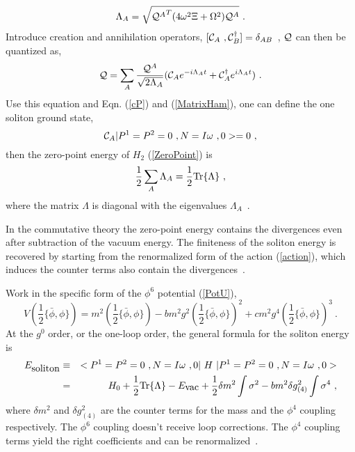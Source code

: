 \documentclass[a4paper,a4paper]{article}
\def\Tr{{\hbox{Tr}}}
\def\cQ{{\cal Q}}
\begin{document}
\begin{equation}
\Lambda_A=\sqrt{{\cQ^A}^T(4\omega^2\Xi+\Omega^2)\cQ^A}\ .                                         \label{EigenFreq}
\end{equation}
Introduce creation and annihilation operators, $[{\cal C}_A\ ,{\cal C}_B^\dag]=\delta_{AB}$\ ,
$\cQ$ can then be quantized as, 
\begin{equation}
  \cQ=\sum_A\frac {\cQ^A}{\sqrt{2\Lambda_A}}
({\cal C}_Ae^{-i\Lambda_At}+{\cal C}_A^\dag e^{i\Lambda_At})\ . 
\end{equation}
Use this equation and Eqn. (\ref{cP}) and (\ref{MatrixHam}), one can 
define the one soliton ground state, 
\begin{equation}
  {\cal C}_A|P^1=P^2=0\ ,N=I\omega\ ,0>=0\ ,
\end{equation}
then the zero-point energy of $H_2$ (\ref{ZeroPoint}) is 
\begin{equation}
  \frac 12\sum_A\Lambda_A=\frac 12\Tr\{\Lambda\}\ ,                                          \label{ZeroPoint2}
\end{equation}
where the matrix $\Lambda$ is diagonal with the eigenvalues $\Lambda_A$\ .

In the commutative theory the zero-point energy contains the divergences
even after subtraction of the vacuum energy. The finiteness of the soliton energy 
is recovered by starting from the renormalized form of the action (\ref{action}), 
which induces the counter terms also contain the divergences~\cite{Rajaraman}. 

Work in the specific form of the $\phi^6$ potential (\ref{PotU}), 
\begin{equation}
  V(\frac 12\{\bar{\phi},\phi\})=m^2(\frac 12\{\bar{\phi},\phi\})                              
-bm^2g^2(\frac 12\{\bar{\phi},\phi\})^2+cm^2g^4(\frac 12\{\bar{\phi},\phi\})^3\ .                   \label{SpecV}
\end{equation}
At the $g^0$ order, or the one-loop order, 
the general formula for the soliton energy is 
\begin{eqnarray}
  E_{\hbox{soliton}}&\equiv&<P^1=P^2=0\ ,N=I\omega\ ,0|~H~|P^1=P^2=0\ ,N=I\omega\ ,0>\\
           &=&H_0+\frac 12\hbox{Tr}\{\Lambda\}-E_{\hbox{vac}}+   
\frac 12\delta m^2\int\sigma^2-bm^2\delta g^2_{(4)}\int\sigma^4\ ,                                  \label{SolEnergy}
\end{eqnarray}
where $\delta m^2$ and $\delta g^2_{(4)}$ are the counter terms for the mass and the 
$\phi^4$ coupling respectively. The $\phi^6$ coupling doesn't receive 
loop corrections. The $\phi^4$ coupling terms yield the right coefficients and can 
be renormalized~\cite{Kos}. 
\end{document}
